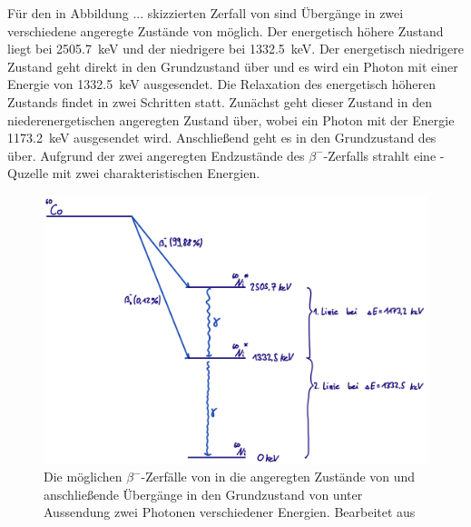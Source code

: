         \FloatBarrier
        
        Für den in Abbildung ... skizzierten Zerfall von  sind Übergänge in zwei verschiedene angeregte Zustände von  möglich. Der energetisch höhere Zustand liegt bei 
        \SI{2505.7}{\kilo\electronvolt} und der niedrigere bei \SI{1332.5}{\kilo\electronvolt}. Der energetisch niedrigere Zustand geht direkt in den Grundzustand über und es wird ein Photon mit einer Energie
        von \SI{1332.5}{\kilo\electronvolt} ausgesendet. Die Relaxation des energetisch höheren Zustands findet in zwei Schritten statt. Zunächst geht dieser Zustand in den niederenergetischen angeregten Zustand 
        über, wobei ein Photon mit der Energie \SI{1173.2}{\kilo\electronvolt} ausgesendet wird. Anschließend geht es in den Grundzustand des  über. Aufgrund der zwei angeregten Endzustände des 
        $\beta^-$-Zerfalls strahlt eine -Quzelle mit zwei charakteristischen Energien.

        \FloatBarrier

        \begin{figure}[h]
          \centering
          \includegraphics[width = 1\textwidth]{pictures/co.png}
          \caption{Die möglichen $\beta^-$-Zerfälle von  in die angeregten Zustände von  und anschließende Übergänge in den Grundzustand von  unter Aussendung zwei Photonen verschiedener Energien. Bearbeitet aus \cite{stolz_radioaktivitat_2003}}
          \label{fig:co_schema}
        \end{figure}
    
        \FloatBarrier

